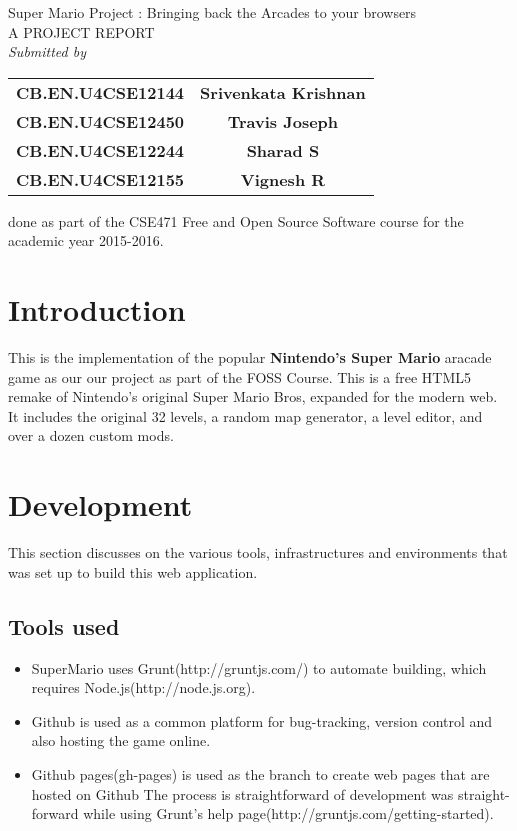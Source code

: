 \documentclass{article}
\begin{document}
\begin{large}
\begin{center}
	Super Mario Project : Bringing back the Arcades to your browsers\\[2\baselineskip]
	A PROJECT REPORT\\[1\baselineskip]
\textit{Submitted by}\\
\begin{table}[ht]
\centering
\begin{tabular}{c  c} 
 \textbf{CB.EN.U4CSE12144}	&\textbf{Srivenkata Krishnan}\\
 \textbf{CB.EN.U4CSE12450}	&\textbf{Travis Joseph}\\
 \textbf{CB.EN.U4CSE12244}	&\textbf{Sharad S}\\
 \textbf{CB.EN.U4CSE12155}	&\textbf{Vignesh R}\\
 
 \end{tabular}
\end{table}
done as part of the CSE471 Free and Open Source Software course for the academic year 2015-2016.
\end{center}
\end{large}
\pagebreak
\tableofcontents
\pagebreak
\section{Introduction} 
	This is the implementation of the popular \textbf{Nintendo's Super Mario} aracade game as our our project as part of the FOSS Course. This is a free HTML5 remake of Nintendo's original Super Mario Bros, expanded for the modern web. It includes the original 32 levels, a random map generator, a level editor, and over a dozen custom mods.
\section{Development}
This section discusses on the various tools, infrastructures and environments that was set up to build this web application.\\
\subsection{Tools used}
\begin{itemize}
\item SuperMario uses Grunt(http://gruntjs.com/) to automate building, which requires Node.js(http://node.js.org).
\item Github is used as a common platform for bug-tracking, version control and also hosting the game online.
\item Github pages(gh-pages) is used as the branch to create web pages that are hosted on Github
 The process is straightforward of development was straight-forward while using  Grunt's help page(http://gruntjs.com/getting-started).
\end{itemize}
\end{document}
